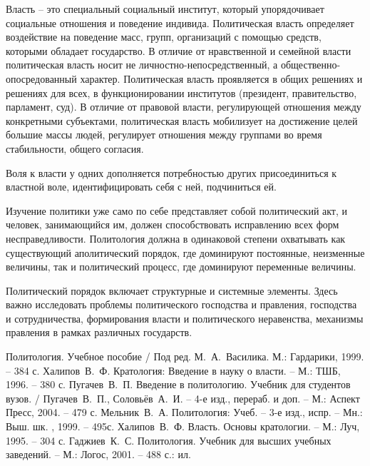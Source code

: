 Власть -- это специальный социальный институт, который упорядочивает социальные
отношения и поведение индивида. Политическая власть определяет воздействие на
поведение масс, групп, организаций с помощью средств, которыми обладает
государство. В отличие от нравственной и семейной власти политическая власть
носит не личностно-непосредственный, а общественно-опосредованный характер.
Политическая власть проявляется в общих решениях и решениях для всех, в
функционировании институтов (президент, правительство, парламент, суд). В
отличие от правовой власти, регулирующей отношения между конкретными
субъектами, политическая власть мобилизует на достижение целей большие массы
людей, регулирует отношения между группами во время стабильности, общего
согласия.

Воля к власти у одних дополняется потребностью других присоединиться к властной
воле, идентифицировать себя с ней, подчиниться ей.

Изучение политики уже само по себе представляет собой политический акт, и
человек, занимающийся им, должен способствовать исправлению всех форм
несправедливости. Политология должна в одинаковой степени охватывать как
существующий аполитический порядок, где доминируют постоянные, неизменные
величины, так и политический процесс, где доминируют переменные величины.

Политический порядок включает структурные и системные элементы. Здесь важно
исследовать проблемы политического господства и правления, господства и
сотрудничества, формирования власти и политического неравенства, механизмы
правления в рамках различных государств.

\newpage %
\renewcommand{\bibname}{Список литературы}

\begin{thebibliography}{9} 
     Политология. Учебное пособие / Под ред. М.~А.~Василика.
    М.: Гардарики, 1999. -- 384 с.
     Халипов~В.~Ф. Кратология: Введение в науку о власти. -- М.: ТШБ,
    1996. -- 380 с.
     Пугачев~В.~П. Введение в политологию. Учебник для студентов
    вузов. / Пугачев~В.~П., Соловьёв~А.~И. -- 4-е изд., перераб. и доп. -- М.:
    Аспект Пресс, 2004. -- 479 с.
     Мельник~В.~А. Политология: Учеб. -- 3-е изд., испр. -- Мн.:
    Выш. шк. , 1999. -- 495с.
     Халипов~В.~Ф. Власть. Основы кратологии. -- М.: Луч, 1995. --
    304 с.
     Гаджиев~К.~С. Политология. Учебник для высших учебных заведений.
    -- М.: Логос, 2001. -- 488 с.: ил.
\end{thebibliography}